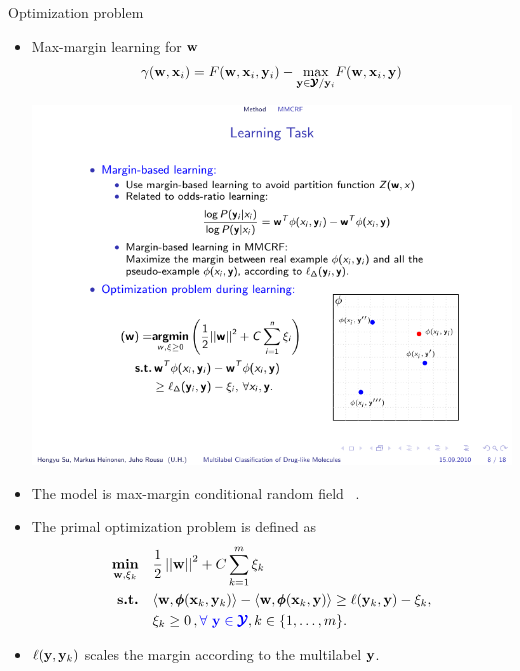 \documentclass[first=dgreen,second=purple,logo=red]{aaltoslides}
\begin{document}
%
\begin{frame}{Optimization problem}
	\begin{itemize}\footnotesize
		\item Max-margin learning for $\mathbf {w}$
		\begin{align*}
			\gamma(\mathbf {w},\mathbf {x}_i) = F(\mathbf {w},\mathbf {x}_i,\mathbf {y}_i) - \underset{\mathbf {y}\in\pmb {\mathcal{Y}}/\mathbf {y}_i}{\max}F(\mathbf {w},\mathbf {x}_i,\mathbf {y})
		\end{align*}
		\begin{center}
			\includegraphics[scale = 0.6]{./figures/jointfeaturespace.pdf}
		\end{center}
		\item The model is max-margin conditional random field \mmcrf\ \cite{Rousu07, su10structured}.
		\item The primal optimization problem is defined as
		\begin{align}
			\underset{\mathbf {w},\xi_k}{\textbf{min}} & \quad \frac{1}{2}\left|\left| \mathbf {w} \right|\right|^2 + C\sum_{k=1}^{m}\xi_k \label{primalmmcrf}\\
			\textbf{s.t.} & \quad \langle \mathbf {w}, \pmb \phi(\mathbf {x}_k,\mathbf {y}_k) \rangle - \langle \mathbf {w}, \pmb \phi(\mathbf {x}_k,\mathbf {y}) \rangle  \geq \ell(\mathbf {y}_k,\mathbf {y}) -  \xi_k, \nonumber\\
			& \quad \xi_k\ge0\, , {\color{blue} \forall\ \mathbf {y}\in\pmb {\mathcal{Y}}}, k \in \{ 1,\dots,m \}.\nonumber
		\end{align}
		\item $\ell(\mathbf {y},\mathbf {y}_k)$ scales the margin according to the multilabel $\mathbf {y}$.
	\end{itemize}
\end{frame}
\end{document}
